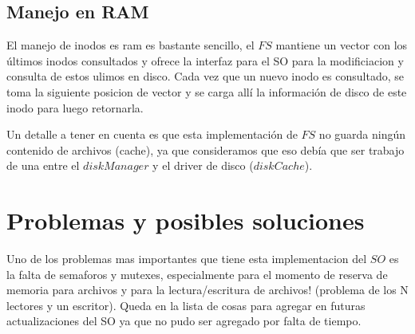 \documentclass[english]{article}
\begin{document}
\subsection{Manejo en RAM}

El manejo de inodos es ram es bastante sencillo, el $FS$ mantiene
un vector con los últimos inodos consultados y ofrece la interfaz
para el SO para la modificiacion y consulta de estos ulimos en disco.
Cada vez que un nuevo inodo es consultado, se toma la siguiente posicion
de vector y se carga allí la información de disco de este inodo para
luego retornarla.

Un detalle a tener en cuenta es que esta implementación de $FS$ no
guarda ningún contenido de archivos (cache), ya que consideramos que
eso debía que ser trabajo de una entre el $diskManager$ y el driver
de disco ($diskCache$).

\pagebreak{}


\section{Problemas y posibles soluciones}

Uno de los problemas mas importantes que tiene esta implementacion
del $SO$ es la falta de semaforos y mutexes, especialmente para el
momento de reserva de memoria para archivos y para la lectura/escritura
de archivos! (problema de los N lectores y un escritor). Queda en
la lista de cosas para agregar en futuras actualizaciones del SO ya
que no pudo ser agregado por falta de tiempo. 
\end{document}
